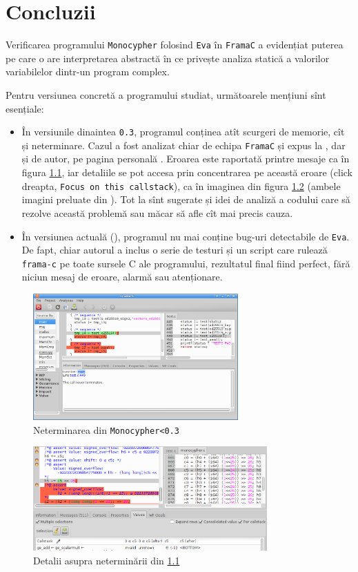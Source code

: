 \chapter{Concluzii}


\indent\indent Verificarea programului \texttt{Monocypher} folosind \texttt{Eva} în \texttt{FramaC}
a evidențiat puterea pe care o are interpretarea abstractă în ce privește analiza
statică a valorilor variabilelor dintr-un program complex.

Pentru versiunea concretă a programului studiat, următoarele mențiuni sînt esențiale:
\begin{itemize}
\item În versiunile dinaintea \texttt{0.3}, programul conținea atît scurgeri de
  memorie, cît și neterminare. Cazul a fost analizat chiar de echipa \texttt{FramaC} și
  expus la \cite{framatut}, dar și de autor, pe pagina personală \cite{loupcrypto}.
  Eroarea este raportată printre mesaje ca în figura \ref{fig:nonterm0}, iar detaliile
  se pot accesa prin concentrarea pe această eroare (click dreapta, \texttt{Focus on this callstack}),
  ca în imaginea din figura \ref{fig:nonterm} (ambele imagini preluate din
  \cite{framatut}). Tot la \cite{framatut}
  sînt sugerate și idei de analiză a codului care să rezolve această problemă sau
  măcar să afle cît mai precis cauza.
\item În versiunea actuală (\cite{gh1}), programul nu mai conține bug-uri detectabile
  de \texttt{Eva}. De fapt, chiar autorul a inclus o serie de testuri și un script
  care rulează \texttt{frama-c} pe toate sursele C ale programului, rezultatul
  final fiind perfect, fără niciun mesaj de eroare, alarmă sau atenționare.
\end{itemize}


\begin{figure}[!htbp]
  \centering
  \includegraphics[width=0.7\textwidth]{img/nonterm0}
  \caption{Neterminarea din \texttt{Monocypher<0.3}}
  \label{fig:nonterm0}
\end{figure}


\begin{figure}[!htbp]
  \centering
  \includegraphics[width=0.8\textwidth]{img/nonterm}
  \caption{Detalii asupra neterminării din \ref{fig:nonterm0}}
  \label{fig:nonterm}
\end{figure}




